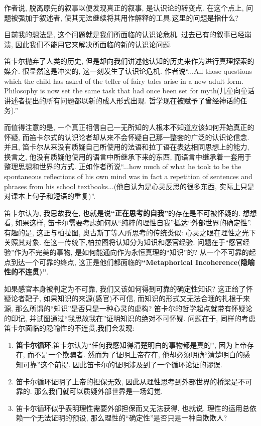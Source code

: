 \documentclass[12pt, a4paper, oneside]{ctexart}
\renewcommand{\b}{\textbf}
\newcommand{\q}[1]{\begin{questionbox}{}#1\end{questionbox}}
\newcommand{\ans}[1]{\begin{ansbox}{}#1\end{ansbox}}
\newcounter{question}[section]
\newcounter{ans}[section]
\begin{document}
\q{作者说, 脱离原先的叙事以便发现真正的叙事, 是认识论的转变点. 在这个点上, 问题被强加于叙述者, 使其无法继续将其用作解释的工具.这里的问题是指什么?}
\ans{目前我的想法是, 这个问题就是我们所面临的认识论危机. 过去已有的叙事已经崩溃, 因此我们不能用它来解决所面临的新的认识论问题.}

笛卡尔抛弃了人类的历史, 但是却向我们讲述他认知的历史来作为进行真理探索的媒介. 很显然这是冲突的, 这一刻发生了认识论危机. 作者说``...All those questions which the child has asked of the teller of fairy tales arise in a new adult form. Philosophy is now set the same task that had once been set for myth(儿童向童话讲述者提出的所有问题都以新的成人形式出现. 哲学现在被赋予了曾经神话的任务).''

而值得注意的是, 一个真正相信自己一无所知的人根本不知道应该如何开始真正的怀疑, 而笛卡尔式的认识论者却从来不会怀疑自己那一整套的广泛的认识论信念. 并且, 笛卡尔从来没有质疑自己所使用的法语和拉丁语在表达相同思想上的能力, 换言之, 他没有质疑他使用的语言中所继承下来的东西, 而语言中继承着一套用于整理思想和世界的方式. 正如作者所说``...how much of what he took to be the spontaneous reflections of his own mind was in fact a repetition of sentences and phrases from his school textbooks...(他自认为是心灵反思的很多东西, 实际上只是对课本上句子和短语的重复)''. 

笛卡尔认为, 我思故我在, 也就是说\b{``正在思考的自我''}的存在是不可被怀疑的. 想想看, 如果这样, 笛卡尔需要考虑如何从``纯粹的理性自我''抵达``外部世界的确定性''. 有趣的是, 这正与柏拉图, 奥古斯丁等人所思考的传统类似: 心灵之眼在理性之光下关照其对象. 在这一传统下,柏拉图将认知分为知识和感官经验. 问题在于``感官经验''作为不完美的事物, 是如何能通向作为永恒真理的``知识''的? 从一个不可靠的起点到达一个可靠的终点, 这正是他们都面临的\b{``Metaphorical Incoherence(隐喻性的不连贯)''}. 

如果感官本身被判定为不可靠, 我们又该如何得到可靠的确定性知识? 这正给了怀疑论者靶子, 如果知识的来源(感官)不可信, 而知识的形式又无法合理的扎根于来源, 那么所谓的``知识''是否只是一种心灵的虚构? 笛卡尔的哲学起点就带有怀疑论的印记, 并试图通过``我思故我在''证明知识的绝对不可怀疑. 问题在于, 同样的考虑笛卡尔面临的隐喻性的不连贯,我们会发现:
\begin{enumerate}
    \item \b{笛卡尔循环}.笛卡尔认为``任何我感知得清楚明白的事物都是真的'', 因为上帝存在, 而不是一个欺骗者. 然而为了证明上帝存在, 他却必须明确``清楚明白的感知可靠''这个前提. 因此笛卡尔的证明涉及到了一个循环论证的谬误.
    \item 笛卡尔循环证明了上帝的担保无效, 因此从理性思考到外部世界的桥梁是不可靠的. 那么我们就可以质疑外部世界是一场幻觉.
    \item 笛卡尔循环似乎表明理性需要外部担保而又无法获得, 也就说, 理性的运用总依赖一个无法证明的预设, 那么理性的``确定性''是否只是一种自欺欺人?
\end{enumerate}
\end{document}
